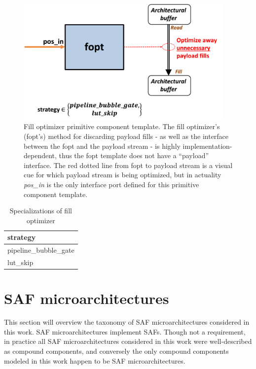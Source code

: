 \begin{figure}[H]
    \centering
    \includegraphics[width=0.95\textwidth]{figures/fopt.png}
    \caption{Fill optimizer primitive component template. The fill optimizer's (fopt's) method for discarding payload fills - as well as the interface between the fopt and the payload stream - is highly implementation-dependent, thus the fopt template does not have a ``payload'' interface. The red dotted line from fopt to payload stream is a visual cue for which payload stream is being optimized, but in actuality \textit{pos\_in} is the only interface port defined for this primitive component template.}
    \label{fig:fopt}
\end{figure}

\begin{table}[H]
\centering
\begin{tabular}{l}
\toprule
 strategy             \\
\midrule
 pipeline\_bubble\_gate \\
 lut\_skip             \\
\bottomrule
\end{tabular}
\caption{Specializations of fill optimizer}
\label{tab:FillOptimizer_specializations}
\end{table}

\section{SAF microarchitectures}

This section will overview the taxonomy of SAF microarchitectures considered in this work. SAF microarchitectures implement SAFs. Though not a requirement, in practice all SAF microarchitectures considered in this work were well-described as compound components, and conversely the only compound components modeled in this work happen to be SAF microarchitectures.


